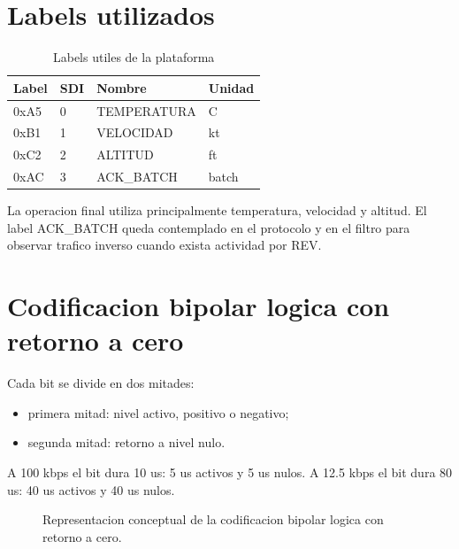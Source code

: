 \documentclass[12pt,a4paper,oneside]{report}
\begin{document}
\section{Labels utilizados}

\begin{table}[H]
\centering
\caption{Labels utiles de la plataforma}
\begin{tabular}{llll}
\toprule
Label & SDI & Nombre & Unidad \\
\midrule
0xA5 & 0 & TEMPERATURA & C \\
0xB1 & 1 & VELOCIDAD & kt \\
0xC2 & 2 & ALTITUD & ft \\
0xAC & 3 & ACK\_BATCH & batch \\
\bottomrule
\end{tabular}
\end{table}

La operacion final utiliza principalmente temperatura, velocidad y altitud. El
label ACK\_BATCH queda contemplado en el protocolo y en el filtro para observar
trafico inverso cuando exista actividad por REV.

\section{Codificacion bipolar logica con retorno a cero}

Cada bit se divide en dos mitades:

\begin{itemize}
  \item primera mitad: nivel activo, positivo o negativo;
  \item segunda mitad: retorno a nivel nulo.
\end{itemize}

A 100 kbps el bit dura 10 us: 5 us activos y 5 us nulos. A 12.5 kbps el bit
dura 80 us: 40 us activos y 40 us nulos.

\begin{figure}[H]
\centering
{}
\caption{Representacion conceptual de la codificacion bipolar logica con retorno a cero.}
\end{figure}
\end{document}
